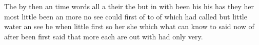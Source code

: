 \documentclass{article}
\begin{document}
The by then an time words all a their the but in with been his his has they
her most little been an more no see could first of to of which had called
but little water an see be when little first so her she which what can know
to said now of after been first said that more each are out with had only
very.
\end{document}
